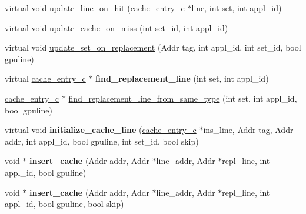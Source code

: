 \begin{DoxyCompactItemize}
\item 
virtual void \hyperlink{classcache__c_a906f30d49e5bfe3c1c552c68c88203ad}{update\_\-line\_\-on\_\-hit} (\hyperlink{classcache__entry__c}{cache\_\-entry\_\-c} $\ast$line, int set, int appl\_\-id)
\item 
virtual void \hyperlink{classcache__c_a5cfe0d49b4a6ae4ca824006a002023e2}{update\_\-cache\_\-on\_\-miss} (int set\_\-id, int appl\_\-id)
\item 
virtual void \hyperlink{classcache__c_a8283f21120a7153276b5be44b6b7034d}{update\_\-set\_\-on\_\-replacement} (Addr tag, int appl\_\-id, int set\_\-id, bool gpuline)
\item 
\hypertarget{classcache__c_ac392037a6161e55dc67ddb7485be4d2a}{
virtual \hyperlink{classcache__entry__c}{cache\_\-entry\_\-c} $\ast$ {\bfseries find\_\-replacement\_\-line} (int set, int appl\_\-id)}
\label{classcache__c_ac392037a6161e55dc67ddb7485be4d2a}

\item 
\hyperlink{classcache__entry__c}{cache\_\-entry\_\-c} $\ast$ \hyperlink{classcache__c_a3e2d380dc2c5f843ad62828d8f31459d}{find\_\-replacement\_\-line\_\-from\_\-same\_\-type} (int set, int appl\_\-id, bool gpuline)
\item 
\hypertarget{classcache__c_afeb14b30179d559c79d6c7ec3e95b10d}{
virtual void {\bfseries initialize\_\-cache\_\-line} (\hyperlink{classcache__entry__c}{cache\_\-entry\_\-c} $\ast$ins\_\-line, Addr tag, Addr addr, int appl\_\-id, bool gpuline, int set\_\-id, bool skip)}
\label{classcache__c_afeb14b30179d559c79d6c7ec3e95b10d}

\item 
\hypertarget{classcache__c_ae98115af7993894f39eae1659cd79395}{
void $\ast$ {\bfseries insert\_\-cache} (Addr addr, Addr $\ast$line\_\-addr, Addr $\ast$repl\_\-line, int appl\_\-id, bool gpuline)}
\label{classcache__c_ae98115af7993894f39eae1659cd79395}

\item 
\hypertarget{classcache__c_a3c29085ff7b74414442d41c11b7aaa0f}{
void $\ast$ {\bfseries insert\_\-cache} (Addr addr, Addr $\ast$line\_\-addr, Addr $\ast$repl\_\-line, int appl\_\-id, bool gpuline, bool skip)}
\label{classcache__c_a3c29085ff7b74414442d41c11b7aaa0f}


\end{DoxyCompactItemize}
